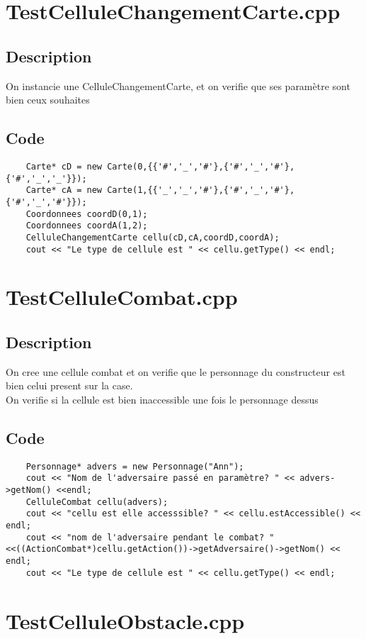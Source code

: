     \section{TestCelluleChangementCarte.cpp}
        \subsection{Description}
            On instancie une CelluleChangementCarte, et on verifie que ses paramètre sont bien ceux souhaites
        \subsection{Code}
\begin{lstlisting}
	Carte* cD = new Carte(0,{{'#','_','#'},{'#','_','#'},{'#','_','_'}});
	Carte* cA = new Carte(1,{{'_','_','#'},{'#','_','#'},{'#','_','#'}});
	Coordonnees coordD(0,1);
	Coordonnees coordA(1,2);
	CelluleChangementCarte cellu(cD,cA,coordD,coordA);
	cout << "Le type de cellule est " << cellu.getType() << endl;
	\end{lstlisting}
    \section{TestCelluleCombat.cpp}
        \subsection{Description}
            On cree une cellule combat et on verifie que le personnage du constructeur est bien celui present sur la case.\\
            On verifie si la cellule est bien inaccessible une fois le personnage dessus
        \subsection{Code}
\begin{lstlisting}
	Personnage* advers = new Personnage("Ann");
	cout << "Nom de l'adversaire passé en paramètre? " << advers->getNom() <<endl;
	CelluleCombat cellu(advers);
	cout << "cellu est elle accesssible? " << cellu.estAccessible() << endl;
	cout << "nom de l'adversaire pendant le combat? " <<((ActionCombat*)cellu.getAction())->getAdversaire()->getNom() << endl;
	cout << "Le type de cellule est " << cellu.getType() << endl;
	\end{lstlisting}
    \section{TestCelluleObstacle.cpp}
